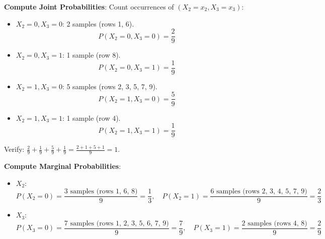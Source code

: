 \documentclass[a3paper,12pt]{extarticle} %
\begin{document}
\begin{enumerate}
\textbf{Compute Joint Probabilities}: Count occurrences of \((X_2 = x_2, X_3 = x_3)\):
\begin{itemize}
    \item \(X_2 = 0, X_3 = 0\): 2 samples (rows 1, 6).
    \[
    P(X_2 = 0, X_3 = 0) = \frac{2}{9}
    \]
    \item \(X_2 = 0, X_3 = 1\): 1 sample (row 8).
    \[
    P(X_2 = 0, X_3 = 1) = \frac{1}{9}
    \]
    \item \(X_2 = 1, X_3 = 0\): 5 samples (rows 2, 3, 5, 7, 9).
    \[
    P(X_2 = 1, X_3 = 0) = \frac{5}{9}
    \]
    \item \(X_2 = 1, X_3 = 1\): 1 sample (row 4).
    \[
    P(X_2 = 1, X_3 = 1) = \frac{1}{9}
    \]
\end{itemize}
Verify: \(\frac{2}{9} + \frac{1}{9} + \frac{5}{9} + \frac{1}{9} = \frac{2 + 1 + 5 + 1}{9} = 1\).

\textbf{Compute Marginal Probabilities}:
\begin{itemize}
    \item \(X_2\):
    \[
    P(X_2 = 0) = \frac{\text{3 samples (rows 1, 6, 8)}}{9} = \frac{1}{3}, \quad P(X_2 = 1) = \frac{\text{6 samples (rows 2, 3, 4, 5, 7, 9)}}{9} = \frac{2}{3}
    \]
    \item \(X_3\):
    \[
    P(X_3 = 0) = \frac{\text{7 samples (rows 1, 2, 3, 5, 6, 7, 9)}}{9} = \frac{7}{9}, \quad P(X_3 = 1) = \frac{\text{2 samples (rows 4, 8)}}{9} = \frac{2}{9}
    \]
\end{itemize}


\end{enumerate}
\end{document}

